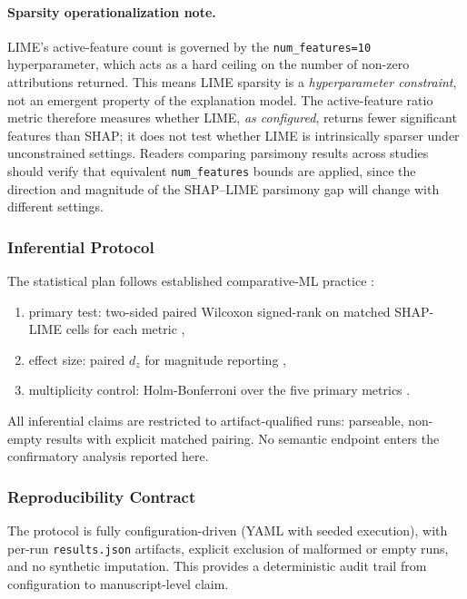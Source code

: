 \documentclass[10pt,a4paper,twoside]{article}
\begin{document}
\paragraph{Sparsity operationalization note.}
LIME's active-feature count is governed by the \texttt{num\_features=10} hyperparameter, which acts as a hard ceiling on the number of non-zero attributions returned. This means LIME sparsity is a \emph{hyperparameter constraint}, not an emergent property of the explanation model. The active-feature ratio metric therefore measures whether LIME, \emph{as configured}, returns fewer significant features than SHAP; it does not test whether LIME is intrinsically sparser under unconstrained settings. Readers comparing parsimony results across studies should verify that equivalent \texttt{num\_features} bounds are applied, since the direction and magnitude of the SHAP--LIME parsimony gap will change with different settings.

\subsubsection{Inferential Protocol}
\label{sec:inference}

The statistical plan follows established comparative-ML practice
\citep{demsar2006statistical}:
\begin{enumerate}[leftmargin=*]
\item primary test: two-sided paired Wilcoxon signed-rank on matched
SHAP-LIME cells for each metric \citep{wilcoxon1945individual},
\item effect size: paired $d_z$ for magnitude reporting
\citep{lakens2013calculating},
\item multiplicity control: Holm-Bonferroni over the five primary metrics
\citep{holm1979simple}.
\end{enumerate}

All inferential claims are restricted to artifact-qualified runs:
parseable, non-empty results with explicit matched pairing. No semantic
endpoint enters the confirmatory analysis reported here.

\subsubsection{Reproducibility Contract}
\label{sec:reproducibility}

The protocol is fully configuration-driven (YAML with seeded execution),
with per-run \texttt{results.json} artifacts, explicit exclusion of
malformed or empty runs, and no synthetic imputation. This provides a
deterministic audit trail from configuration to manuscript-level claim.
\end{document}
